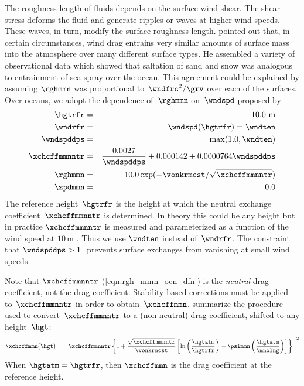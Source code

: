 \documentclass[12pt,twoside]{book}
\begin{document}
The roughness length of fluids depends on the surface wind shear.
The shear stress deforms the fluid and generate ripples or waves at
higher wind speeds.
These waves, in turn, modify the surface roughness length.
\cite{Cha83} pointed out that, in certain circumstances, wind drag
entrains very similar amounts of surface mass into the atmosphere over
many different surface types.
He assembled a variety of observational data which showed that
saltation of sand and snow was analogous to entrainment of sea-spray
over the ocean.
This agreement could be explained by assuming $\rghmmn$ was
proportional to~$\wndfrc^{2}/\grv$ over each of the surfaces.
Over oceans, we adopt the dependence of~$\rghmmn$ on~$\wndspd$
proposed by \cite{LaP82}
\begin{eqnarray}
\hgtrfr & = & 10.0\ \mbox{m} \\
\wndrfr & = & \wndspd ( \hgtrfr ) = \wndten \\
\wndspddps & = & \max ( 1.0 , \wndten) \\
\xchcffmmnntr & = & \frac{0.0027}{\wndspddps} + 0.000142 + 
0.0000764 \wndspddps \\ %
\rghmmn & = & 10.0 \exp( - \vonkrmcst / \sqrt{\xchcffmmnntr} ) \\ %
\zpdmmn & = & 0.0 %
\label{eqn:rgh_mmn_ocn_dfn}
\end{eqnarray}
The reference height~$\hgtrfr$ is the height at which the neutral
exchange coefficient~$\xchcffmmnntr$ is determined. 
In theory this could be any height but in practice $\xchcffmmnntr$ is
measured and parameterized as a function of the wind speed at $10$\,m
\cite[e.g.,][]{LaP81, NOS97, BKL97}.
Thus we use $\wndten$ instead of~$\wndrfr$.
The constraint that $\wndspddps > 1$\,\mxs\ prevents surface exchanges
from vanishing at small wind speeds.

Note that $\xchcffmmnntr$ (\ref{eqn:rgh_mmn_ocn_dfn}) is 
the \textit{neutral} drag coefficient, not the drag coefficient.
Stability-based corrections must be applied to~$\xchcffmmnntr$ in
order to obtain~$\xchcffmmn$. 
\cite{LaP81} summarize the procedure used to convert~$\xchcffmmnntr$
to a (non-neutral) drag coefficient, shifted to any height~$\hgt$:
\begin{eqnarray}
\xchcffmmn(\hgt) & = & \xchcffmmnntr \left\{ 1 + 
\frac{\sqrt { \xchcffmmnntr}}{\vonkrmcst} 
\left[ \ln \left( \frac{\hgtatm}{\hgtrfr} \right) 
- \psimmn \left( \frac{\hgtatm}{\mnolng} \right) \right] \right\}^{-2}
\label{eqn:cff_xch_cff_xch_ntr}
\end{eqnarray}
When $\hgtatm = \hgtrfr$, then $\xchcffmmn$ is the drag coefficient at
the reference height.
\end{document}
